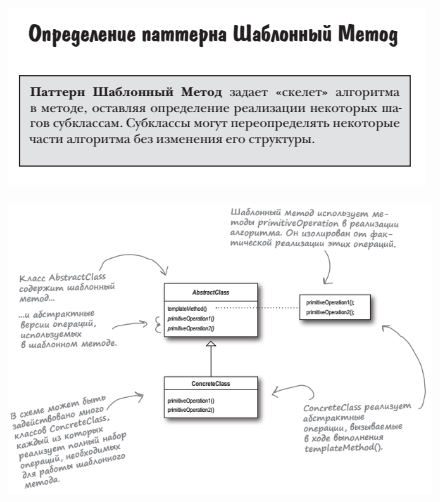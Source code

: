\documentclass{beamer}
\begin{document}
\begin{frame}
\begin{figure}[h]
\centering
\includegraphics[scale=0.8]{images/lec12-pic13.png}
\label{pic-sort}
\end{figure}
\end{frame}

\begin{frame}
\begin{figure}[h]
\centering
\includegraphics[scale=0.7]{images/lec12-pic14.png}
\label{pic-sort}
\end{figure}
\end{frame}
\end{document}
